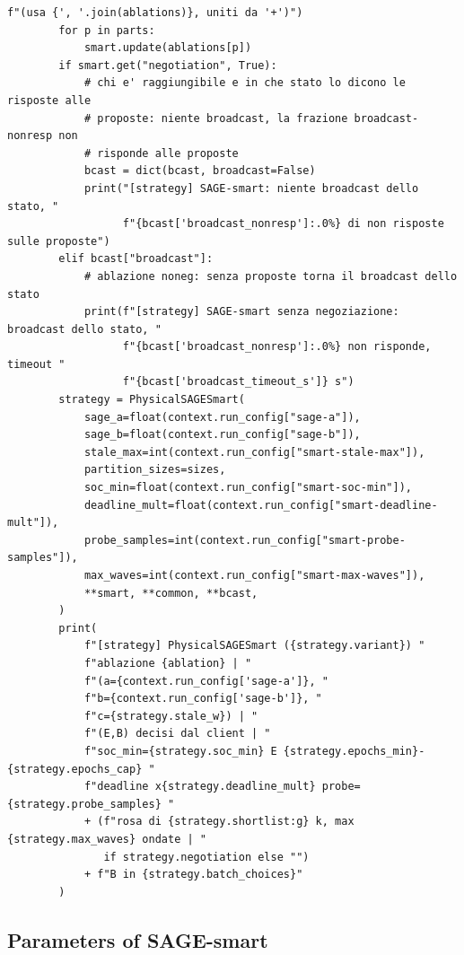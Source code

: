 \documentclass[11pt,a4paper]{article}
\begin{document}
\begin{lstlisting}[style=py,firstnumber=174,caption={\texttt{tesifl/tesiFL/server\_app.py}, lines 174--249}]
                             f"(usa {', '.join(ablations)}, uniti da '+')")
        for p in parts:
            smart.update(ablations[p])
        if smart.get("negotiation", True):
            # chi e' raggiungibile e in che stato lo dicono le risposte alle
            # proposte: niente broadcast, la frazione broadcast-nonresp non
            # risponde alle proposte
            bcast = dict(bcast, broadcast=False)
            print("[strategy] SAGE-smart: niente broadcast dello stato, "
                  f"{bcast['broadcast_nonresp']:.0%} di non risposte sulle proposte")
        elif bcast["broadcast"]:
            # ablazione noneg: senza proposte torna il broadcast dello stato
            print(f"[strategy] SAGE-smart senza negoziazione: broadcast dello stato, "
                  f"{bcast['broadcast_nonresp']:.0%} non risponde, timeout "
                  f"{bcast['broadcast_timeout_s']} s")
        strategy = PhysicalSAGESmart(
            sage_a=float(context.run_config["sage-a"]),
            sage_b=float(context.run_config["sage-b"]),
            stale_max=int(context.run_config["smart-stale-max"]),
            partition_sizes=sizes,
            soc_min=float(context.run_config["smart-soc-min"]),
            deadline_mult=float(context.run_config["smart-deadline-mult"]),
            probe_samples=int(context.run_config["smart-probe-samples"]),
            max_waves=int(context.run_config["smart-max-waves"]),
            **smart, **common, **bcast,
        )
        print(
            f"[strategy] PhysicalSAGESmart ({strategy.variant}) "
            f"ablazione {ablation} | "
            f"(a={context.run_config['sage-a']}, "
            f"b={context.run_config['sage-b']}, "
            f"c={strategy.stale_w}) | "
            f"(E,B) decisi dal client | "
            f"soc_min={strategy.soc_min} E {strategy.epochs_min}-{strategy.epochs_cap} "
            f"deadline x{strategy.deadline_mult} probe={strategy.probe_samples} "
            + (f"rosa di {strategy.shortlist:g} k, max {strategy.max_waves} ondate | "
               if strategy.negotiation else "")
            + f"B in {strategy.batch_choices}"
        )
\end{lstlisting}

\subsection{Parameters of SAGE-smart}
\end{document}

